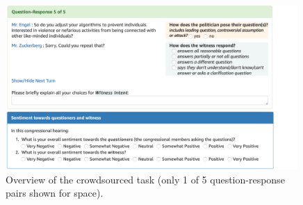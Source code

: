 \begin{figure}
\centering
\includegraphics[width=0.99\textwidth]{plots/subj_amt_screenshots_main.pdf}
\vspace{-.3em}
\caption{Overview of the crowdsourced task (only 1 of 5 question-response pairs shown for space).}
\label{fig:subj_amt_screenshots_main}
\end{figure}

